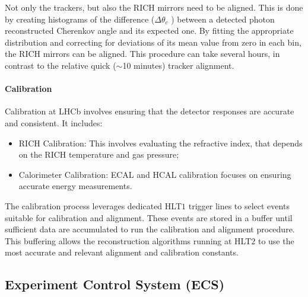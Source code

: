Not only the trackers, but also the RICH mirrors need to be aligned. This is done by creating histograms of the difference ($\Delta \theta_c$ ) between a detected photon reconstructed Cherenkov angle and its expected one. By fitting the appropriate distribution and correcting for deviations of its mean value from zero in each bin, the RICH mirrors can be aligned. This procedure can take several hours, in contrast to the relative quick ($\sim$10 minutes) tracker alignment.
\paragraph{Calibration}
Calibration at LHCb involves ensuring that the detector responses are accurate and consistent. It includes:
\begin{itemize}
\item RICH Calibration: This involves evaluating the refractive index, that depends on the RICH temperature and gas pressure;
\item Calorimeter Calibration: ECAL and HCAL calibration focuses on ensuring accurate energy measurements.
\end{itemize}
The calibration process leverages dedicated HLT$1$ trigger lines to select events suitable for calibration and alignment. These events are stored in a buffer until sufficient data are accumulated to run the calibration and alignment procedure. This buffering allows the reconstruction algorithms running at HLT$2$ to use the most accurate and relevant alignment and calibration constants.


\subsection{Experiment Control System (ECS)}\label{sec:ecs}

